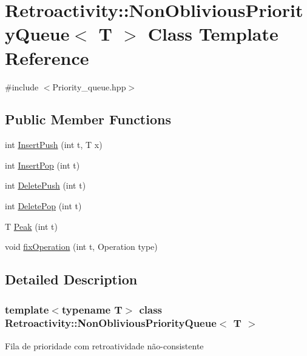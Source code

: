 \hypertarget{classRetroactivity_1_1NonObliviousPriorityQueue}{}\section{Retroactivity\+:\+:Non\+Oblivious\+Priority\+Queue$<$ T $>$ Class Template Reference}
\label{classRetroactivity_1_1NonObliviousPriorityQueue}


{\ttfamily \#include $<$Priority\+\_\+queue.\+hpp$>$}

\subsection*{Public Member Functions}
\begin{DoxyCompactItemize}
\item 
int \hyperlink{classRetroactivity_1_1NonObliviousPriorityQueue_a0d03417fe0fc639044e9d7385146563a}{Insert\+Push} (int t, T x)
\item 
int \hyperlink{classRetroactivity_1_1NonObliviousPriorityQueue_a2d45d481f3eec3d668ce48f8b3e7d5c3}{Insert\+Pop} (int t)
\item 
int \hyperlink{classRetroactivity_1_1NonObliviousPriorityQueue_a1b65ca1c3b88ce7ae5975794abc6593b}{Delete\+Push} (int t)
\item 
int \hyperlink{classRetroactivity_1_1NonObliviousPriorityQueue_a1098d1d1bf1be62fd384fbe1905a8f2a}{Delete\+Pop} (int t)
\item 
T \hyperlink{classRetroactivity_1_1NonObliviousPriorityQueue_ad08c048ac7647ea395654a373b03b3d8}{Peak} (int t)
\item 
void \hyperlink{classRetroactivity_1_1NonObliviousPriorityQueue_aea039a8fc820950319380b900f2f2099}{fix\+Operation} (int t, Operation type)
\end{DoxyCompactItemize}


\subsection{Detailed Description}
\subsubsection*{template$<$typename T$>$\newline
class Retroactivity\+::\+Non\+Oblivious\+Priority\+Queue$<$ T $>$}

Fila de prioridade com retroatividade não-\/consistente 

